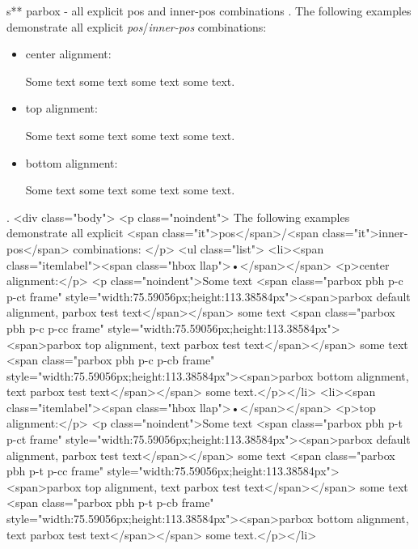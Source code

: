 s** parbox - all explicit pos and inner-pos combinations
.
\noindent
The following examples demonstrate all explicit \emph{pos}/\emph{inner-pos} combinations:
\begin{itemize}
\item center alignment:

\noindent
Some text
some text
some text
some text.

\item top alignment:

\noindent
Some text
some text
some text
some text.

\item bottom alignment:

\noindent
Some text
some text
some text
some text.
\end{itemize}
.
<div class="body">
<p class="noindent">
The following examples demonstrate all explicit <span class="it">pos</span>/<span class="it">inner‐pos</span> combinations:
</p>
<ul class="list">
<li><span class="itemlabel"><span class="hbox llap">•</span></span>
<p>center alignment:</p>
<p class="noindent">Some text <span class="parbox pbh p-c p-ct frame" style="width:75.59056px;height:113.38584px"><span>parbox default alignment, parbox test text</span></span> some text <span class="parbox pbh p-c p-cc frame" style="width:75.59056px;height:113.38584px"><span>parbox top alignment, text parbox test text</span></span> some text <span class="parbox pbh p-c p-cb frame" style="width:75.59056px;height:113.38584px"><span>parbox bottom alignment, text parbox test text</span></span> some text.</p></li>
<li><span class="itemlabel"><span class="hbox llap">•</span></span>
<p>top alignment:</p>
<p class="noindent">Some text <span class="parbox pbh p-t p-ct frame" style="width:75.59056px;height:113.38584px"><span>parbox default alignment, parbox test text</span></span> some text <span class="parbox pbh p-t p-cc frame" style="width:75.59056px;height:113.38584px"><span>parbox top alignment, text parbox test text</span></span> some text <span class="parbox pbh p-t p-cb frame" style="width:75.59056px;height:113.38584px"><span>parbox bottom alignment, text parbox test text</span></span> some text.</p></li>
